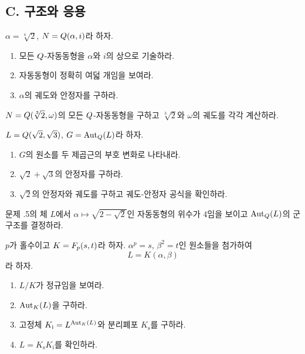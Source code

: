 \subsection*{C. 구조와 응용}

\begin{exercise}[*]
$\alpha=\sqrt[4]{2}$, $N=Q(\alpha,i)$라 하자.
\begin{enumerate}[label=(\alph*)]
  \item 모든 $Q$-자동동형을 $\alpha$와 $i$의 상으로 기술하라.
  \item 자동동형이 정확히 여덟 개임을 보여라.
  \item $\alpha$의 궤도와 안정자를 구하라.
\end{enumerate}
\end{exercise}

\begin{exercise}
$N=Q(\sqrt[3]{2},\omega)$의 모든 $Q$-자동동형을 구하고 $\sqrt[3]{2}$와 $\omega$의 궤도를 각각 계산하라.
\end{exercise}

\begin{exercise}[*]
$L=Q(\sqrt2,\sqrt3)$, $G=\operatorname{Aut}_Q(L)$라 하자.
\begin{enumerate}[label=(\alph*)]
  \item $G$의 원소를 두 제곱근의 부호 변화로 나타내라.
  \item $\sqrt2+\sqrt3$의 안정자를 구하라.
  \item $\sqrt2$의 안정자와 궤도를 구하고 궤도-안정자 공식을 확인하라.
\end{enumerate}
\end{exercise}

\begin{exercise}
문제 \thechapter.5의 체 $L$에서 $\alpha\mapsto\sqrt{2-\sqrt2}$인 자동동형의 위수가 $4$임을 보이고 $\operatorname{Aut}_Q(L)$의 군 구조를 결정하라.
\end{exercise}

\begin{exercise}[*]
$p$가 홀수이고 $K=F_p(s,t)$라 하자. $\alpha^p=s$, $\beta^2=t$인 원소들을 첨가하여
\[
  L=K(\alpha,\beta)
\]
라 하자.
\begin{enumerate}[label=(\alph*)]
  \item $L/K$가 정규임을 보여라.
  \item $\operatorname{Aut}_K(L)$을 구하라.
  \item 고정체 $K_{\mathrm i}=L^{\operatorname{Aut}_K(L)}$와 분리폐포 $K_{\mathrm s}$를 구하라.
  \item $L=K_{\mathrm s}K_{\mathrm i}$를 확인하라.
\end{enumerate}
\end{exercise}


